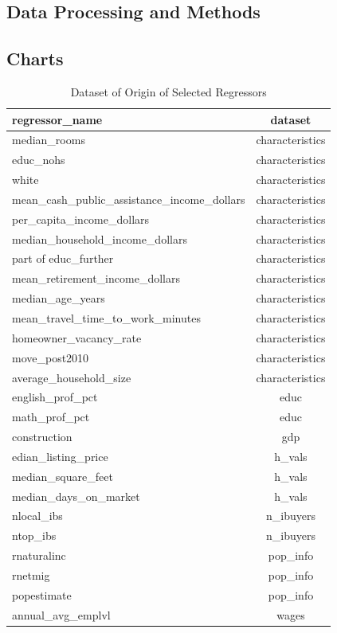 \subsection{Data Processing and Methods}\label{subsection_data_processing_and_methods}

\subsection{Charts}

\begin{table}
    \centering
    \caption{Dataset of Origin of Selected Regressors}\label{regressor_origin}
    \begin{tabular}{| l || c |}
    \hline
    regressor\_name &          dataset \\
    \hline
    \hline
    median\_rooms &  characteristics \\ \hline
    educ\_nohs &  characteristics \\ \hline
    white &  characteristics \\ \hline
    mean\_cash\_public\_assistance\_income\_dollars &  characteristics \\ \hline
    per\_capita\_income\_dollars &  characteristics \\ \hline
    median\_household\_income\_dollars &  characteristics \\ \hline
    part of educ\_further &  characteristics \\ \hline
    mean\_retirement\_income\_dollars &  characteristics \\ \hline
    median\_age\_years &  characteristics \\ \hline
    mean\_travel\_time\_to\_work\_minutes &  characteristics \\ \hline
    homeowner\_vacancy\_rate &  characteristics \\ \hline
    move\_post2010 &  characteristics \\ \hline
    average\_household\_size &  characteristics \\ \hline
    english\_prof\_pct &             educ \\ \hline
    math\_prof\_pct &             educ \\ \hline
    construction &              gdp \\ \hline
    edian\_listing\_price &           h\_vals \\ \hline
    median\_square\_feet &           h\_vals \\ \hline
    median\_days\_on\_market &           h\_vals \\ \hline
    nlocal\_ibs &        n\_ibuyers \\ \hline
    ntop\_ibs &        n\_ibuyers \\ \hline
    rnaturalinc &         pop\_info \\ \hline
    rnetmig &         pop\_info \\ \hline
    popestimate &         pop\_info \\ \hline
    annual\_avg\_emplvl &            wages \\ \hline
    \end{tabular}
\end{table}

